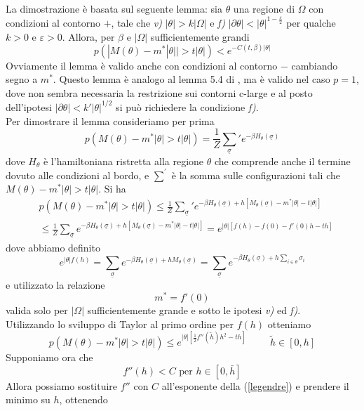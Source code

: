 \documentclass[aps,pre]{revtex4}
\newcommand{\beq}{\begin{equation}}
\newcommand{\eeq}{\end{equation}}
\begin{document}
\noindent
La dimostrazione \`e basata sul seguente lemma: sia $\theta$ una regione di $\Omega$ con condizioni al contorno $+$, tale che {\it v)} $|\theta| > k |\Omega|$ e {\it f)} $|\partial \theta| < |\theta|^{1-\frac{\varepsilon}{2}}$ per qualche $k>0$ e $\varepsilon > 0$. Allora, per $\beta$ e $|\Omega|$ sufficientemente grandi
\beq
\label{lemma}
p(|M(\theta)-m^* |\theta|| > t |\theta|) < e^{-C(t,\beta) |\theta|}
\eeq
Ovviamente il lemma \`e valido anche con condizioni al contorno $-$ cambiando segno a $m^*$. Questo lemma \`e analogo al lemma 5.4 di \cite{GMM}, ma \`e valido nel caso $p=1$, dove non sembra necessaria la restrizione sui contorni c-large e al posto dell'ipotesi $|\partial \theta|< k' |\theta|^{1/2}$ si pu\`o richiedere la condizione {\it f)}. \\
Per dimostrare il lemma consideriamo per prima
\beq
p(M(\theta)-m^* |\theta| > t |\theta|) = \frac{1}{Z} \text{$\sum_{\underline \sigma}$}' e^{-\beta H_\theta(\underline \sigma)}
\eeq
dove $H_\theta$ \`e l'hamiltoniana ristretta alla regione $\theta$ che comprende anche il termine dovuto alle condizioni al bordo, e $\sum^\prime$ \`e la somma sulle configurazioni tali che $M(\theta)-m^* |\theta| > t |\theta|$. Si ha
\beq
\begin{split}
&p(M(\theta)-m^* |\theta| > t |\theta|) \leq \frac{1}{Z} \text{$\sum_{\underline \sigma}$}' e^{-\beta H_\theta(\underline \sigma) + h [ M_\theta(\underline \sigma) - m^* |\theta| - t |\theta|]} \\ &\leq \frac{1}{Z} \sum_{\underline \sigma} e^{-\beta H_\theta(\underline \sigma) + h [ M_\theta(\underline \sigma) - m^* |\theta| - t |\theta|]} = e^{|\theta| [f(h)-f(0) - f'(0) h - th]}
\end{split}
\eeq
dove abbiamo definito
\beq
e^{|\theta| f(h)} =  \sum_{\underline \sigma} e^{-\beta H_\theta(\underline \sigma) + h  M_\theta(\underline \sigma)} = \sum_{\underline \sigma} e^{-\beta H_\theta(\underline \sigma) + h \sum_{i \in \theta} \sigma_i }
\eeq
e utilizzato la relazione
\beq
m^* = f'(0)
\eeq
valida solo per $|\Omega|$ sufficientemente grande e sotto le ipotesi {\it v)} ed {\it f)}. \\
Utilizzando lo sviluppo di Taylor al primo ordine per $f(h)$ otteniamo
\beq
\label{legendre}
p(M(\theta)-m^* |\theta| > t |\theta|) \leq  e^{|\theta| [\frac{1}{2} f''(\tilde h) h^2 - th]} \hspace{1cm} \tilde h \in [0,h]
\eeq
Supponiamo ora che
\beq
\label{stimacorrelazione}
f''(h) < C \text{ per } h \in [0,\bar h]
\eeq
Allora possiamo sostituire $f''$ con $C$ all'esponente della (\ref{legendre}) e prendere il minimo su $h$, ottenendo
\end{document}
